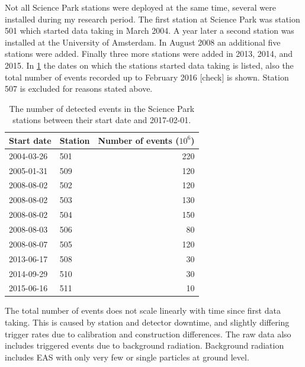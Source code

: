 Not all Science Park stations were deployed at the same time, several were installed during my research period. The first station at Science Park was station 501 which started data taking in March 2004. A year later a second station was installed at the University of Amsterdam. In August 2008 an additional five stations were added. Finally three more stations were added in 2013, 2014, and 2015. In \cref{tab:detected_events} the dates on which the stations started data taking is listed, also the total number of events recorded up to February 2016 [check] is shown. Station 507 is excluded for reasons stated above.

\begin{table}
    \centering
    \begin{tabular}{@{}llr@{}}
        \toprule
        Start date & Station & Number of events ($10^6$) \\
        \midrule
        2004-03-26 & 501     &                       220 \\
        2005-01-31 & 509     &                       120 \\
        2008-08-02 & 502     &                       120 \\
        2008-08-02 & 503     &                       130 \\
        2008-08-02 & 504     &                       150 \\
        2008-08-03 & 506     &                        80 \\
        2008-08-07 & 505     &                       120 \\
        2013-06-17 & 508     &                        30 \\
        2014-09-29 & 510     &                        30 \\
        2015-06-16 & 511     &                        10 \\
        \bottomrule
    \end{tabular}
    \caption{The number of detected events in the Science Park stations between their start date and 2017-02-01.}
    \label{tab:detected_events}
\end{table}

The total number of events does not scale linearly with time since first data taking. This is caused by station and detector downtime, and slightly differing trigger rates due to calibration and construction differences. The raw data also includes triggered events due to background radiation. Background radiation includes EAS with only very few or single particles at ground level.


